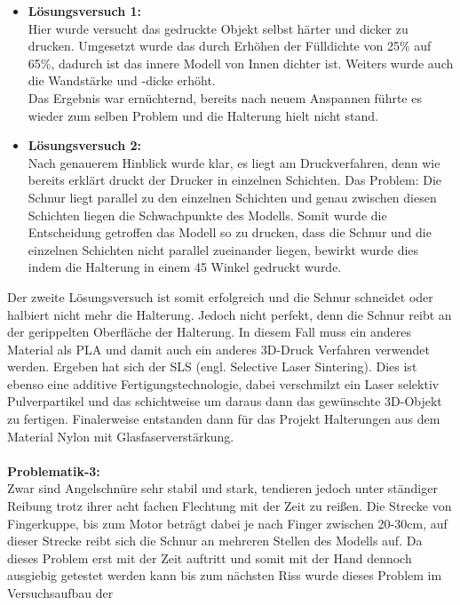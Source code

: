 \documentclass[titlepage,12pt,twoside]{article}
\begin{document}
\begin{itemize}
	\item \textbf{Lösungsversuch 1:} \\
	Hier wurde versucht das gedruckte Objekt selbst härter und dicker zu drucken. Umgesetzt wurde das durch Erhöhen der Fülldichte von 25\% auf 65\%, dadurch ist das innere Modell von Innen dichter ist. Weiters wurde auch die Wandstärke 
	und -dicke erhöht. \\
	Das Ergebnis war ernüchternd, bereits nach neuem Anspannen führte es wieder zum selben Problem und die Halterung hielt nicht stand.
	\item \textbf{Lösungsversuch 2:} \\
	Nach genauerem Hinblick wurde klar, es liegt am Druckverfahren, denn wie bereits erklärt druckt der Drucker in einzelnen Schichten. Das Problem: Die Schnur liegt parallel zu den einzelnen Schichten und genau zwischen diesen Schichten 
	liegen die Schwachpunkte des Modells. Somit wurde die Entscheidung getroffen das Modell so zu drucken, dass die Schnur und die einzelnen Schichten nicht parallel zueinander liegen, bewirkt wurde dies indem die Halterung in einem 45\textdegree 
	Winkel gedruckt wurde.
\end{itemize}
\hfill \break
Der zweite Lösungsversuch ist somit erfolgreich und die Schnur schneidet oder halbiert nicht mehr die Halterung. Jedoch nicht perfekt, denn die Schnur reibt an der gerippelten Oberfläche der Halterung. In diesem Fall muss ein anderes Material als 
PLA und damit auch ein anderes 3D-Druck Verfahren verwendet werden. Ergeben hat sich der SLS (engl. Selective Laser Sintering). Dies ist ebenso eine additive Fertigungstechnologie, dabei verschmilzt ein Laser selektiv Pulverpartikel und das 
schichtweise um daraus dann das gewünschte 3D-Objekt zu fertigen. Finalerweise entstanden dann für das Projekt Halterungen aus dem Material Nylon mit Glasfaserverstärkung. \\ %
\\
\textbf{Problematik-3:} \\
Zwar sind Angelschnüre sehr stabil und stark, tendieren jedoch unter ständiger Reibung trotz ihrer acht fachen Flechtung mit der Zeit zu reißen. Die Strecke von Fingerkuppe, bis zum Motor beträgt dabei je nach Finger zwischen 20-30cm, 
auf dieser Strecke reibt sich die Schnur an mehreren Stellen des Modells auf. Da dieses Problem erst mit der Zeit auftritt und somit mit der Hand dennoch ausgiebig getestet werden kann bis zum nächsten Riss wurde dieses Problem im Versuchsaufbau der 
\end{document}
